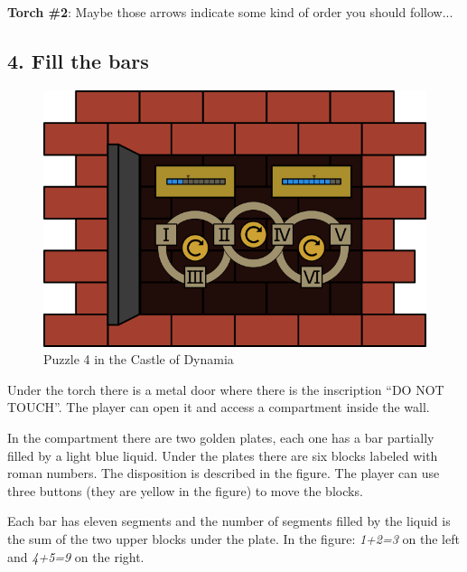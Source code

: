 \textbf{Torch \#{}2}: Maybe those arrows indicate some kind of order you should follow...



\subsection{4. Fill the bars}

\begin{figure}[H]
  \centering
  \includegraphics[width=\textwidth]{Images/Puzzles/castleOfDynamia4}
  \caption{Puzzle 4 in the Castle of Dynamia}
\end{figure}


Under the torch there is a metal door where there is the inscription \enquote{DO NOT TOUCH}. The player can open it and access a compartment inside the wall.

In the compartment there are two golden plates, each one has a bar partially filled by a light blue liquid. Under the plates there are six blocks labeled with roman numbers. The disposition is described in the figure. The player can use three buttons (they are yellow in the figure) to move the blocks.

Each bar has eleven segments and the number of segments filled by the liquid is the sum of the two upper blocks under the plate. In the figure: \textit{1+2=3} on the left and \textit{4+5=9} on the right.

